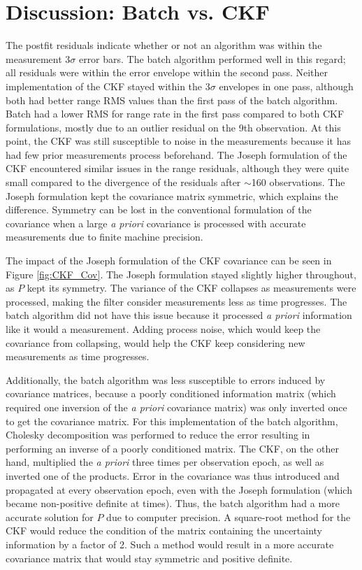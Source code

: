 \documentclass[]{aiaa-tc}%
\begin{document}
	\section{Discussion: Batch vs. CKF}
	
	The postfit residuals indicate whether or not an algorithm was within the measurement 3$\sigma$ error bars.  The batch algorithm performed well in this regard; all residuals were within the error envelope within the second pass. Neither implementation of the CKF stayed within the 3$\sigma$ envelopes in one pass, although both had better range RMS values than the first pass of the batch algorithm. Batch had a lower RMS for range rate in the first pass compared to both CKF formulations, mostly due to an outlier residual on the 9th observation.  At this point, the CKF was still susceptible to noise in the measurements because it has had few prior measurements process beforehand.  The Joseph formulation of the CKF encountered similar issues in the range residuals, although they were quite small compared to the divergence of the residuals after $\sim$160 observations.  The Joseph formulation kept the covariance matrix symmetric, which explains the difference.  Symmetry can be lost in the conventional formulation of the covariance when a large \textit{a priori} covariance is processed with accurate measurements due to finite machine precision\cite{Born}.
	
	\vspace{5 mm}

	The impact of the Joseph formulation of the CKF covariance can be seen in Figure \ref{fig:CKF_Cov}. The Joseph formulation stayed slightly higher throughout, as $P$ kept its symmetry.  The variance of the CKF collapses as measurements were processed, making the filter consider measurements less as time progresses. The batch algorithm did not have this issue because it processed \textit{a priori} information like it would a measurement. Adding process noise, which would keep the covariance from collapsing, would help the CKF keep considering new measurements as time progresses.  
	
	\vspace{5 mm}

	Additionally, the batch algorithm was less susceptible to errors induced by covariance matrices, because a poorly conditioned information matrix (which required one inversion of the \textit{a priori} covariance matrix) was only inverted once to get the covariance matrix.  For this implementation of the batch algorithm, Cholesky decomposition was performed to reduce the error resulting in performing an inverse of a poorly conditioned matrix. The CKF, on the other hand, multiplied the \textit{a priori} three times per observation epoch, as well as inverted one of the products.  Error in the covariance was thus introduced and propagated at every observation epoch, even with the Joseph formulation (which became non-positive definite at times). Thus, the batch algorithm had a more accurate solution for $P$ due to computer precision. A square-root method for the CKF would reduce the condition of the matrix containing the uncertainty information by a factor of 2. Such a method would result in a more accurate covariance matrix that would stay symmetric and positive definite.
	
\end{document}

